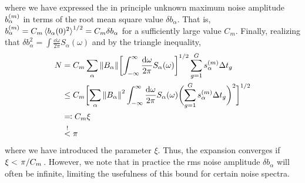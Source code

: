where we have expressed the in principle unknown maximum noise amplitude $b_\alpha^{(m)}$ in terms of the root mean square value $\delta b_\alpha$.
That is, $b_\alpha^{(m)} = C_m \expval*{b_\alpha(0)^2}^{1/2} =  C_m \delta b_\alpha$ for a sufficiently large value $C_m$.
Finally, realizing that $\delta b_\alpha^2 = \int\frac{\dd{\omega}}{2\pi} S_\alpha(\omega)$ and by the triangle inequality,
\begin{equation}
    \begin{split}
        N &= C_m\sum_{\alpha}\norm{B_\alpha}\biggl[\int_{-\infty}^\infty\frac{\mathrm{d}\omega}{2\pi} S_\alpha(\omega)\biggr]^{1/2}
            \sum_{g=1}^{G} s_\alpha^{(m)}\Delta t_g \\
          &\leq C_m\biggl[\sum_{\alpha}\norm{B_\alpha}^2\int_{-\infty}^\infty\frac{\mathrm{d}\omega}{2\pi} S_\alpha(\omega)
            \biggl(\sum_{g=1}^{G} s_\alpha^{(m)}\Delta t_g\biggr)^2\biggr]^{1/2} \\
          &\eqqcolon C_m\xi \\
          &\overset{!}{<} \pi
    \end{split}
\end{equation}
where we have introduced the parameter $\xi$.
Thus, the expansion converges if $\xi < \flatfrac{\pi}{C_m}$.
However, we note that in practice the rms noise amplitude $\delta b_\alpha$ will often be infinite, limiting the usefulness of this bound for certain noise spectra.
